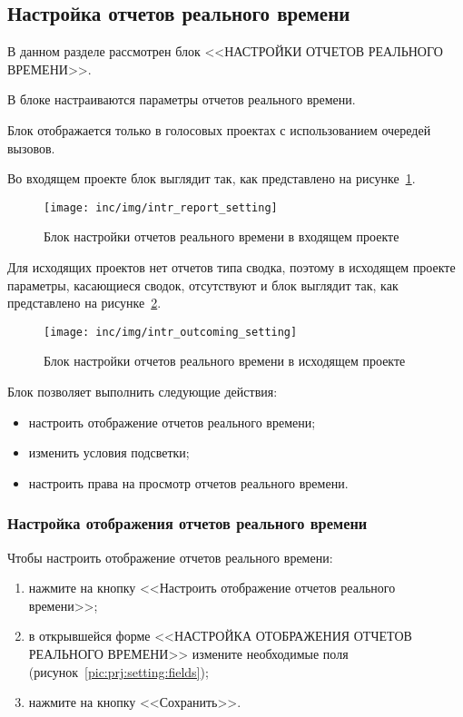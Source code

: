 \subsection{Настройка отчетов реального времени}\label{subsec:настройка-отчетов-реального-времени}

В данном разделе рассмотрен блок <<НАСТРОЙКИ ОТЧЕТОВ РЕАЛЬНОГО ВРЕМЕНИ>>.

В блоке настраиваются параметры отчетов реального времени.

Блок отображается только в голосовых проектах с использованием очередей вызовов.

Во входящем проекте блок выглядит так, как представлено на рисунке~\ref{pic:incoming:setting}.

\begin{figure}[!ht]
    \centering
    \texttt{[image: inc/img/intr\_report\_setting]}
    \caption{Блок настройки отчетов реального времени в входящем проекте}
    \label{pic:incoming:setting}
\end{figure}

Для исходящих проектов нет отчетов типа сводка, поэтому в исходящем проекте параметры,
касающиеся сводок, отсутствуют и блок выглядит так, как представлено на рисунке~\ref{pic:outcoming:setting}.

\begin{figure}[!ht]
    \centering
    \texttt{[image: inc/img/intr\_outcoming\_setting]}
    \caption{Блок настройки отчетов реального времени в исходящем проекте}
    \label{pic:outcoming:setting}
\end{figure}

Блок позволяет выполнить следующие действия:
\begin{itemize}
    \item настроить отображение отчетов реального времени;
    \item изменить условия подсветки;
    \item настроить права на просмотр отчетов реального времени.
\end{itemize}

\subsubsection{Настройка отображения отчетов реального времени}

Чтобы настроить отображение отчетов реального времени:
\begin{enumerate}
    \item нажмите на кнопку <<Настроить отображение отчетов реального времени>>;
    \item в открывшейся форме <<НАСТРОЙКА ОТОБРАЖЕНИЯ ОТЧЕТОВ РЕАЛЬНОГО ВРЕМЕНИ>>
    измените необходимые поля (рисунок~\ref{pic:prj:setting:fields});
    \item нажмите на кнопку <<Сохранить>>.
\end{enumerate}

